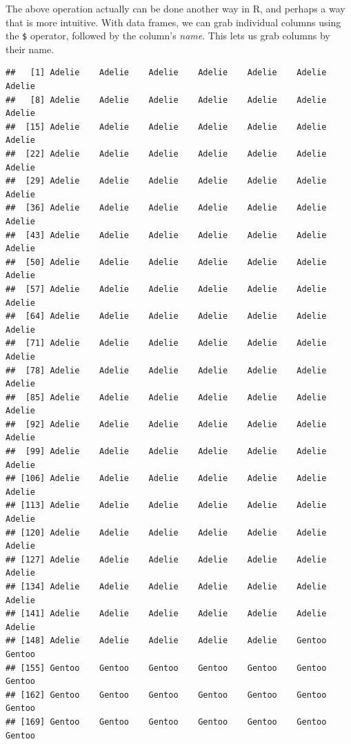 \documentclass[
]{book}
\newenvironment{Shaded}{\begin{snugshade}}{\end{snugshade}}
\newcommand{\NormalTok}[1]{#1}
\newcommand{\SpecialCharTok}[1]{\textcolor[rgb]{0.81,0.36,0.00}{\textbf{#1}}}
\begin{document}
The above operation actually can be done another way in R, and perhaps a way that is more intuitive. With data frames, we can grab individual columns using the \texttt{\$} operator, followed by the column's \emph{name}. This lets us grab columns by their name.

\begin{Shaded}
\end{Shaded}

\begin{verbatim}
##   [1] Adelie    Adelie    Adelie    Adelie    Adelie    Adelie    Adelie   
##   [8] Adelie    Adelie    Adelie    Adelie    Adelie    Adelie    Adelie   
##  [15] Adelie    Adelie    Adelie    Adelie    Adelie    Adelie    Adelie   
##  [22] Adelie    Adelie    Adelie    Adelie    Adelie    Adelie    Adelie   
##  [29] Adelie    Adelie    Adelie    Adelie    Adelie    Adelie    Adelie   
##  [36] Adelie    Adelie    Adelie    Adelie    Adelie    Adelie    Adelie   
##  [43] Adelie    Adelie    Adelie    Adelie    Adelie    Adelie    Adelie   
##  [50] Adelie    Adelie    Adelie    Adelie    Adelie    Adelie    Adelie   
##  [57] Adelie    Adelie    Adelie    Adelie    Adelie    Adelie    Adelie   
##  [64] Adelie    Adelie    Adelie    Adelie    Adelie    Adelie    Adelie   
##  [71] Adelie    Adelie    Adelie    Adelie    Adelie    Adelie    Adelie   
##  [78] Adelie    Adelie    Adelie    Adelie    Adelie    Adelie    Adelie   
##  [85] Adelie    Adelie    Adelie    Adelie    Adelie    Adelie    Adelie   
##  [92] Adelie    Adelie    Adelie    Adelie    Adelie    Adelie    Adelie   
##  [99] Adelie    Adelie    Adelie    Adelie    Adelie    Adelie    Adelie   
## [106] Adelie    Adelie    Adelie    Adelie    Adelie    Adelie    Adelie   
## [113] Adelie    Adelie    Adelie    Adelie    Adelie    Adelie    Adelie   
## [120] Adelie    Adelie    Adelie    Adelie    Adelie    Adelie    Adelie   
## [127] Adelie    Adelie    Adelie    Adelie    Adelie    Adelie    Adelie   
## [134] Adelie    Adelie    Adelie    Adelie    Adelie    Adelie    Adelie   
## [141] Adelie    Adelie    Adelie    Adelie    Adelie    Adelie    Adelie   
## [148] Adelie    Adelie    Adelie    Adelie    Adelie    Gentoo    Gentoo   
## [155] Gentoo    Gentoo    Gentoo    Gentoo    Gentoo    Gentoo    Gentoo   
## [162] Gentoo    Gentoo    Gentoo    Gentoo    Gentoo    Gentoo    Gentoo   
## [169] Gentoo    Gentoo    Gentoo    Gentoo    Gentoo    Gentoo    Gentoo   

\end{verbatim}
\end{document}
